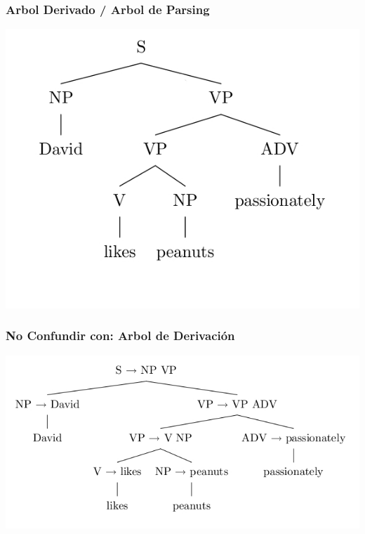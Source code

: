 \documentclass[compress,color=usenames]{beamer}
\begin{document}
\begin{frame}
\frametitle{Arbol Derivado / Arbol de Parsing}

\begin{center}
\includegraphics[scale=.4]{pics/pic2-1.jpg}
\end{center}
\end{frame}

\begin{frame}
\frametitle{No Confundir con: Arbol de Derivaci\'on}

\begin{center}
\includegraphics[scale=.4]{pics/pic2-2.jpg}
\end{center}
\end{frame}
\end{document}
